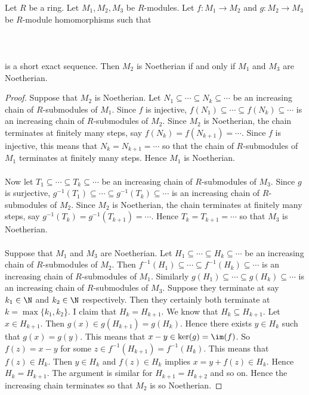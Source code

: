 \documentclass[a4paper]{article}
\begin{document}
\begin{prp}{}{} Let $R$ be a ring. Let $M_1,M_2,M_3$ be $R$-modules. Let $f:M_1\to M_2$ and $g:M_2\to M_3$ be $R$-module homomorphisms such that \\~\\
\\~\\
is a short exact sequence. Then $M_2$ is Noetherian if and only if $M_1$ and $M_3$ are Noetherian. \tcbline
\begin{proof}
Suppose that $M_2$ is Noetherian. Let $N_1\subseteq\cdots\subseteq N_k\subseteq\cdots$ be an increasing chain of $R$-submodules of $M_1$. Since $f$ is injective, $f(N_1)\subseteq\cdots\subseteq f(N_k)\subseteq\cdots$ is an increasing chain of $R$-submodules of $M_2$. Since $M_2$ is Noetherian, the chain terminates at finitely many steps, say $f(N_k)=f(N_{k+1})=\cdots$. Since $f$ is injective, this means that $N_k=N_{k+1}=\cdots$ so that the chain of $R$-submodules of $M_1$ terminates at finitely many steps. Hence $M_1$ is Noetherian. \\~\\

Now let $T_1\subseteq\cdots\subseteq T_k\subseteq\cdots$ be an increasing chain of $R$-submodules of $M_3$. Since $g$ is surjective, $g^{-1}(T_1)\subseteq\cdots\subseteq g^{-1}(T_k)\subseteq\cdots$ is an increasing chain of $R$-submodules of $M_2$. Since $M_2$ is Noetherian, the chain terminates at finitely many steps, say $g^{-1}(T_k)=g^{-1}(T_{k+1})=\cdots$. Hence $T_k=T_{k+1}=\cdots$ so that $M_3$ is Noetherian. \\~\\

Suppose that $M_1$ and $M_3$ are Noetherian. Let $H_1\subseteq\cdots\subseteq H_k\subseteq\cdots$ be an increasing chain of $R$-submodules of $M_2$. Then $f^{-1}(H_1)\subseteq\cdots\subseteq f^{-1}(H_k)\subseteq\cdots$ is an increasing chain of $R$-submodules of $M_1$. Similarly $g(H_1)\subseteq\cdots\subseteq g(H_k)\subseteq\cdots$ is an increasing chain of $R$-submodules of $M_3$. Suppose they terminate at say $k_1\in\N$ and $k_2\in\N$ respectively. Then they certainly both terminate at $k=\max\{k_1,k_2\}$. I claim that $H_k=H_{k+1}$. We know that $H_k\subseteq H_{k+1}$. Let $x\in H_{k+1}$. Then $g(x)\in g(H_{k+1})=g(H_k)$. Hence there exists $y\in H_k$ such that $g(x)=g(y)$. This means that $x-y\in\ker(g)=\im(f)$. So $f(z)=x-y$ for some $z\in f^{-1}(H_{k+1})=f^{-1}(H_k)$. This means that $f(z)\in H_k$. Then $y\in H_k$ and $f(z)\in H_k$ implies $x=y+f(z)\in H_k$. Hence $H_k=H_{k+1}$. The argument is similar for $H_{k+1}=H_{k+2}$ and so on. Hence the increasing chain terminates so that $M_2$ is so Noetherian. 
\end{proof}
\end{prp}
\end{document}
